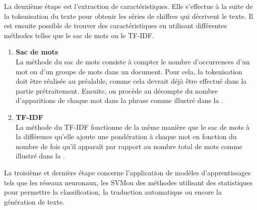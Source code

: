 \documentclass{rapport}
\begin{document}
La deuxième étape est l'extraction de caractéristiques. Elle s'effectue à la suite de la tokenisation du texte pour obtenir les séries de chiffres qui décrivent le texte. Il est ensuite possible de trouver des caractéristiques en utilisant différentes méthodes telles que le sac de mots ou le TF-IDF.
\begin{enumerate}[listparindent=0pt, parsep=0pt]

    \item \textbf{Sac de mots}\\
    La méthode du sac de mots consiste à compter le nombre d'occurrences d'un mot ou d'un groupe de mots dans un document. Pour cela, la tokenisation doit être réalisée au préalable, comme cela devrait déjà être effectué dans la partie prétraitement. Ensuite, on procède au décompte du nombre d'apparitions de chaque mot dans la phrase comme illustré dans la .
    
    \item \textbf{TF-IDF}\\
    La méthode du TF-IDF fonctionne de la même manière que le sac de mots à la différence qu'elle ajoute une pondération à chaque mot en fonction du nombre de fois qu'il apparaît par rapport au nombre total de mots comme illustré dans la .

\end{enumerate}
La troisième et dernière étape concerne l'application de modèles d'apprentissages tels que les réseaux neuronaux, les SVM\footnotemark[1] ou des méthodes utilisant des statistiques pour permettre la classification, la traduction automatique ou encore la génération de texte.  
\end{document}
